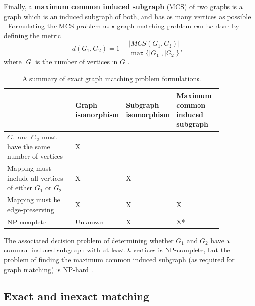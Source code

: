 \documentclass[12pt]{thesis}
\theoremstyle{plain}
\theoremstyle{definition}
\theoremstyle{remark}
\begin{document}
Finally, a \textbf{maximum common induced subgraph} (MCS) of two graphs is a graph which is an induced subgraph of both, and has as many vertices as possible  \cite{wikiMaximumCommonSubgraph}. Formulating the MCS problem as a graph matching problem can be done by defining the metric \[d(G_1,G_2) = 1 - \frac{|MCS(G_1,G_2)|}{\max\{|G_1|,|G_2|\}},\] where $|G|$ is the number of vertices in $G$ \cite{Bunke_1998,Bunke_1997}.

\begin{table}[h]
\centering
\begin{tabular}{|L{0.35\linewidth}|L{0.15\linewidth}|L{0.15\linewidth}|L{0.22\linewidth}|}
\hline
 & Graph isomorphism & Subgraph isomorphism & Maximum common induced subgraph \\ \hline
$G_1$ and $G_2$ must have the same number of vertices & X & & \\ \hline
Mapping must include all vertices of either $G_1$ or $G_2$ & X & X & \\ \hline
Mapping must be edge-preserving & X & X & X \\ \hline
NP-complete & Unknown & X & X* \\ \hline
\end{tabular}
\flushleft\footnotesize *The associated decision problem of determining whether $G_1$ and $G_2$ have a common induced subgraph with at least $k$ vertices is NP-complete, but the problem of finding the maximum common induced subgraph (as required for graph matching) is NP-hard \cite{wikiMaximumCommonSubgraph}.
\caption{A summary of exact graph matching problem formulations.}
\label{NP_classifications}
\end{table}

\subsection{Exact and inexact matching}\label{section:exact_and_inexact_matching}
\end{document}
